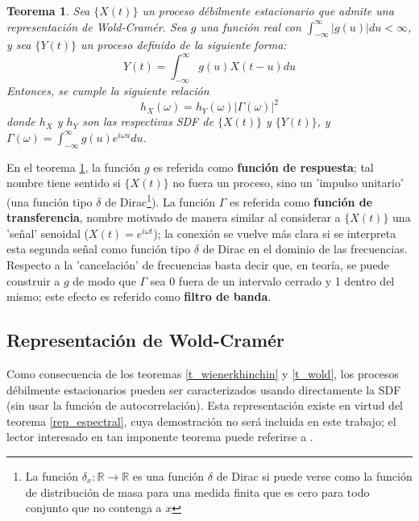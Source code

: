 \documentclass[12pt,a4paper]{mitthesis}
\newtheorem{thrm}{Teorema}
\newcommand{\R}{\mathbb{R}}
\newcommand{\intR}{\int_{-\infty}^{\infty}}
\newcommand{\dirac}{$\delta$  de Dirac}
\newcommand{\abso}[1]{\left| #1 \right|}
\begin{document}
\begin{thrm}
Sea $\{ X(t) \}$ un proceso d\'ebilmente estacionario que admite una representaci\'on de 
Wold-Cram\'er. Sea $g$ una funci\'on real con $\intR \abso{g(u)} du < \infty$, y sea $\{ Y(t) \}$ 
un proceso definido de la siguiente forma:
\begin{equation*}
Y(t) = \intR g(u) X(t-u) du
\end{equation*}
Entonces, se cumple la siguiente relaci\'on
\begin{equation*}
h_X(\omega) = h_Y(\omega) \abso{\Gamma(\omega)}^{2}
\end{equation*}
donde $h_X$ y $h_Y$ son las respectivas SDF de $\{X(t)\}$ y $\{Y(t)\}$, y 
$\Gamma(\omega) = \intR g(u) e^{i \omega u} du$.
\label{filtro}
\end{thrm}

En el teorema \ref{filtro}, la funci\'on $g$ es referida como \textbf{funci\'on de respuesta}; tal 
nombre tiene sentido si $\{X(t)\}$ no fuera un proceso, sino un 'impulso unitario' (una funci\'on 
tipo \dirac \footnote{La funci\'on $\delta_x:\R\rightarrow \R$ es una funci\'on $\delta$ de Dirac 
si puede verse como la funci\'on de distribuci\'on de masa para una medida finita que es cero para 
todo conjunto que no contenga a $x$}).
La funci\'on $\Gamma$ es referida como \textbf{funci\'on de transferencia}, nombre motivado de 
manera similar al considerar a $\{X(t)\}$ una 'se\~nal' senoidal ($X(t) = e^{i \omega t}$); la 
conexi\'on se vuelve m\'as clara si se interpreta esta segunda se\~nal como funci\'on tipo \dirac 
en el dominio de las frecuencias.
Respecto a la 'cancelaci\'on' de frecuencias basta decir que, en teor\'ia, se puede construir a $g$ 
de modo que $\Gamma$ sea 0 fuera de un intervalo cerrado y 1 dentro del mismo; este efecto es 
referido como \textbf{filtro de banda}.


\subsection{Representaci\'on de Wold-Cram\'er}

Como consecuencia de los teoremas \ref{t_wienerkhinchin} y \ref{t_wold}, los procesos d\'ebilmente 
estacionarios pueden ser caracterizados usando directamente la SDF (sin usar la funci\'on de
autocorrelaci\'on).
Esta representaci\'on existe en virtud del teorema \ref{rep_espectral}, cuya demostraci\'on no 
ser\'a incluida en este trabajo; el lector interesado en tan imponente teorema puede referirse a 
\cite{Priestley81}.
\end{document}
